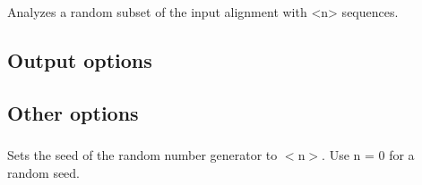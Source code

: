 \subsubsection{} Analyzes a random subset of the input alignment with <n> sequences.



\subsection{Output options}

\subsubsection{}


\subsection{Other options}

\subsubsection{} Sets the seed of the random number generator to $<$n$>$. Use n = 0 for a random seed.










